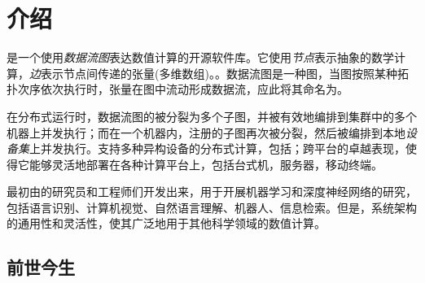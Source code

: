 \begin{savequote}[45mm]
\end{savequote}

\chapter{介绍} 
\label{ch:introduction}

\begin{content}

\tf{}是一个使用\emph{数据流图}表达数值计算的开源软件库。它使用\emph{节点}表示抽象的数学计算，\emph{边}表示节点间传递的张量(多维数组)。。数据流图是一种图，当图按照某种拓扑次序依次执行时，张量在图中流动形成数据流，应此将其命名为\tf{}。

在分布式运行时，数据流图的被分裂为多个子图，并被有效地编排到集群中的多个机器上并发执行；而在一个机器内，注册的子图再次被分裂，然后被编排到本地\emph{设备集}上并发执行。\tf{}支持多种异构设备的分布式计算，包括；\tf{}跨平台的卓越表现，使得它能够灵活地部署在各种计算平台上，包括台式机，服务器，移动终端。

\tf{}最初由的研究员和工程师们开发出来，用于开展机器学习和深度神经网络的研究，包括语言识别、计算机视觉、自然语言理解、机器人、信息检索。但是，\tf{}系统架构的通用性和灵活性，使其广泛地用于其他科学领域的数值计算。

\end{content}

\section{前世今生}

